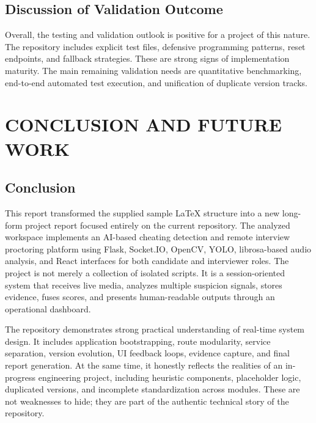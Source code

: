 \documentclass[12pt,a4paper]{extreport}
\begin{document}
\section{Discussion of Validation Outcome}
Overall, the testing and validation outlook is positive for a project of this nature. The repository includes explicit test files, defensive programming patterns, reset endpoints, and fallback strategies. These are strong signs of implementation maturity. The main remaining validation needs are quantitative benchmarking, end-to-end automated test execution, and unification of duplicate version tracks.

\chapter{CONCLUSION AND FUTURE WORK}
\section{Conclusion}
This report transformed the supplied sample \LaTeX{} structure into a new long-form project report focused entirely on the current repository. The analyzed workspace implements an AI-based cheating detection and remote interview proctoring platform using Flask, Socket.IO, OpenCV, YOLO, librosa-based audio analysis, and React interfaces for both candidate and interviewer roles. The project is not merely a collection of isolated scripts. It is a session-oriented system that receives live media, analyzes multiple suspicion signals, stores evidence, fuses scores, and presents human-readable outputs through an operational dashboard.

The repository demonstrates strong practical understanding of real-time system design. It includes application bootstrapping, route modularity, service separation, version evolution, UI feedback loops, evidence capture, and final report generation. At the same time, it honestly reflects the realities of an in-progress engineering project, including heuristic components, placeholder logic, duplicated versions, and incomplete standardization across modules. These are not weaknesses to hide; they are part of the authentic technical story of the repository.
\end{document}
